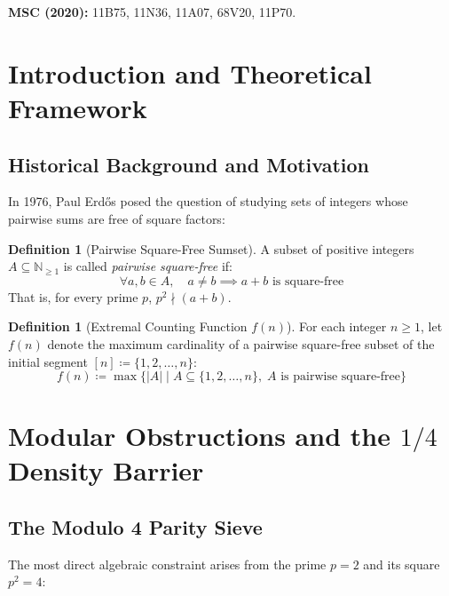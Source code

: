 \documentclass[11pt,a4paper]{article}
\theoremstyle{definition}
\newtheorem{definition}[theorem]{Definition}
\begin{document}
\noindent\textbf{MSC (2020):} 11B75, 11N36, 11A07, 68V20, 11P70.

\tableofcontents
\newpage

\section{Introduction and Theoretical Framework}

\subsection{Historical Background and Motivation}
In 1976, Paul Erd\H{o}s \cite{erdos1976} posed the question of studying sets of integers whose pairwise sums are free of square factors:

\begin{definition}[Pairwise Square-Free Sumset]\label{def:sqfree_sumset}
A subset of positive integers $A \subseteq \mathbb{N}_{\ge 1}$ is called \emph{pairwise square-free} if:
\begin{equation}\label{eq:sqfree_sum_def}
\forall a, b \in A, \quad a \ne b \implies a + b \text{ is square-free}
\end{equation}
That is, for every prime $p$, $p^2 \nmid (a + b)$.
\end{definition}

\begin{definition}[Extremal Counting Function $f(n)$]\label{def:fn_def}
For each integer $n \ge 1$, let $f(n)$ denote the maximum cardinality of a pairwise square-free subset of the initial segment $[n] \coloneqq \{1, 2, \dots, n\}$:
\begin{equation}\label{eq:fn_max}
f(n) \coloneqq \max \{ |A| \mid A \subseteq \{1, 2, \dots, n\}, \; A \text{ is pairwise square-free} \}
\end{equation}
\end{definition}

\section{Modular Obstructions and the $1/4$ Density Barrier}

\subsection{The Modulo 4 Parity Sieve}
The most direct algebraic constraint arises from the prime $p = 2$ and its square $p^2 = 4$:
\end{document}
